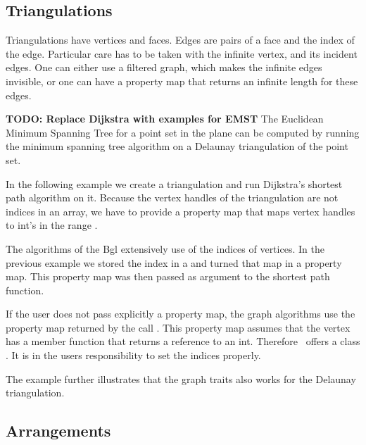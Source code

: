 \subsection{Triangulations}

Triangulations have vertices and faces. Edges are pairs of a face and the
index of the edge.
Particular care has to be taken with the infinite vertex, and its incident
edges. One can either use a filtered graph, which makes the infinite edges
invisible, or one can have a property map that returns an infinite length
for these edges.


{\bf TODO: Replace Dijkstra with examples for EMST}
The Euclidean Minimum Spanning Tree for a point set in the plane can be
computed by running the minimum spanning tree algorithm on a Delaunay
triangulation of the point set.




In the following example we create a triangulation and run Dijkstra's shortest path
algorithm on it. Because the vertex handles of the triangulation are not indices
in an array, we have to provide a property map that maps vertex handles to
int's in the range \ccc{[0, t.number_of_vertices())}.




The algorithms of the {\sc Bgl} extensively use of the indices of
vertices. In the previous example we stored the index in a 
and turned that map in a property map. This property map was then
passed as argument to the shortest path function.

If the user does not pass explicitly a property map, the graph algorithms
use the property map returned by the call .
This property map assumes that the vertex has a 
member function  that returns a reference to an int.
Therefore \cgal\ offers a class .
It is in the users responsibility to set the indices properly.

The example further illustrates that the graph traits also works
for the Delaunay triangulation.



\subsection{Arrangements}





